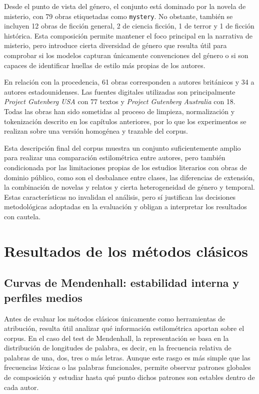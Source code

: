 \documentclass[IB]{TFUOC}%
\begin{document}
Desde el punto de vista del género, el conjunto está dominado por la novela de misterio, con 79 obras etiquetadas como \texttt{mystery}. No obstante, también se incluyen 12 obras de ficción general, 2 de ciencia ficción, 1 de terror y 1 de ficción histórica. Esta composición permite mantener el foco principal en la narrativa de misterio, pero introduce cierta diversidad de género que resulta útil para comprobar si los modelos capturan únicamente convenciones del género o si son capaces de identificar huellas de estilo más propias de los autores.

En relación con la procedencia, 61 obras corresponden a autores británicos y 34 a autores estadounidenses. Las fuentes digitales utilizadas son principalmente \textit{Project Gutenberg USA} con 77 textos y \textit{Project Gutenberg Australia} con 18. Todas las obras han sido sometidas al proceso de limpieza, normalización y tokenización descrito en los capítulos anteriores, por lo que los experimentos se realizan sobre una versión homogénea y trazable del corpus.

Esta descripción final del corpus muestra un conjunto suficientemente amplio para realizar una comparación estilométrica entre autores, pero también condicionada por las limitaciones propias de los estudios literarios con obras de dominio público, como son el desbalance entre clases, las diferencias de extensión, la combinación de novelas y relatos y cierta heterogeneidad de género y temporal. Estas características no invalidan el análisis, pero sí justifican las decisiones metodológicas adoptadas en la evaluación y obligan a interpretar los resultados con cautela.

\section{Resultados de los métodos clásicos}

\subsection{Curvas de Mendenhall: estabilidad interna y perfiles medios}

Antes de evaluar los métodos clásicos únicamente como herramientas de atribución, resulta útil analizar qué información estilométrica aportan sobre el corpus. En el caso del test de Mendenhall, la representación se basa en la distribución de longitudes de palabra, es decir, en la frecuencia relativa de palabras de una, dos, tres o más letras. Aunque este rasgo es más simple que las frecuencias léxicas o las palabras funcionales, permite observar patrones globales de composición y estudiar hasta qué punto dichos patrones son estables dentro de cada autor.
\end{document}
